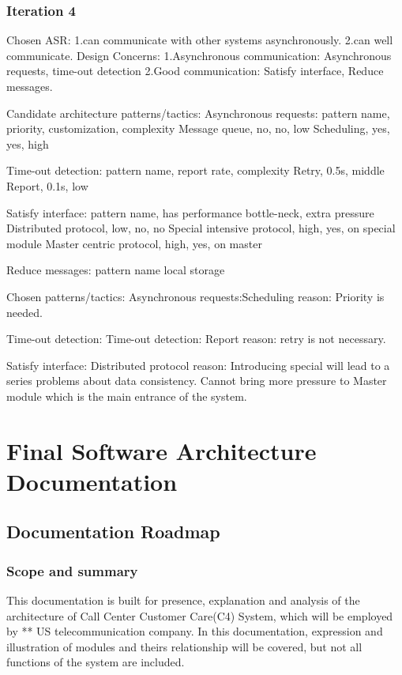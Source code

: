 \documentclass{article}
\begin{document}
		\subsubsection{Iteration 4}
		Chosen ASR: 
		1.can communicate with other systems asynchronously.
		2.can well communicate.
		Design Concerns:
		1.Asynchronous communication: Asynchronous requests, time-out detection
		2.Good communication: Satisfy interface, Reduce messages.

		Candidate architecture patterns/tactics:
		Asynchronous requests:
			pattern name, priority, customization, complexity
			Message queue, no, no, low
			Scheduling, yes, yes, high
		
		Time-out detection:
			pattern name, report rate, complexity
			Retry, 0.5s, middle
			Report, 0.1s, low
		
		Satisfy interface:
			pattern name, has performance bottle-neck, extra pressure
			Distributed protocol, low, no, no
			Special intensive protocol, high, yes, on special module
			Master centric protocol, high, yes, on master
		
		Reduce messages:
			pattern name
			local storage
		
		Chosen patterns/tactics:
		Asynchronous requests:Scheduling
		reason: Priority is needed.

		Time-out detection:
		Time-out detection: Report
		reason: retry is not necessary.

		Satisfy interface: Distributed protocol
		reason: Introducing special will lead to a series problems about data consistency. Cannot bring more pressure to Master module which is the main entrance of the system.


		
		

	\section{Final Software Architecture Documentation}
	\subsection{Documentation Roadmap}
	\subsubsection{Scope and summary}
	This documentation is built for presence, explanation and analysis of the architecture of Call Center Customer Care(C4) System, which will be employed by ** US telecommunication company. In this documentation, expression and illustration of modules and theirs relationship will be covered, but not all functions of the system are included.
\end{document}
